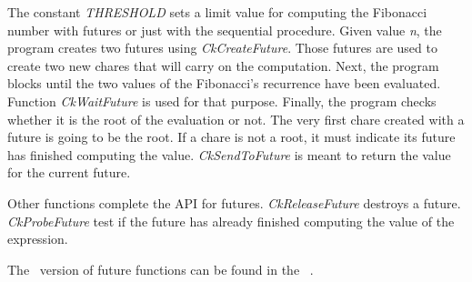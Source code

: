 The constant {\em THRESHOLD} sets a limit value for computing the Fibonacci number with futures or just with the sequential procedure. Given value {\em n}, the program creates two futures using {\em CkCreateFuture}. Those futures are used to create two new chares that will carry on the computation. Next, the program blocks until the two values of the Fibonacci's recurrence have been evaluated. Function {\em CkWaitFuture} is used for that purpose. Finally, the program checks whether it is the root of the evaluation or not. The very first chare created with a future is going to be the root. If a chare is not a root, it must indicate its future has finished computing the value. {\em CkSendToFuture} is meant to return the value for the current future.

Other functions complete the API for futures. {\em CkReleaseFuture} destroys a future. {\em CkProbeFuture} test if the future has already finished computing the value of the expression.

The \converse\ version of future functions can be found in the \converse\ .

